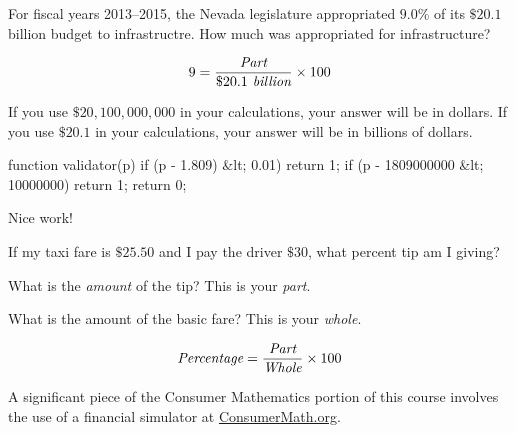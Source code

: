 \documentclass{ximera}
\begin{document}
\begin{question}
For fiscal years 2013--2015, the Nevada legislature appropriated $9.0\%$ of its $\$20.1$ billion budget to infrastructre. How much was appropriated for infrastructure? 	

\begin{solution}
\begin{hint}
\begin{equation*}9=\frac{\emph{\text{Part}}}{\$20.1\emph{\text{ billion}}}\times 100\end{equation*}
\end{hint}
\begin{hint}
If you use $\$20,100,000,000$ in your calculations, your answer will be in dollars. If you use $\$20.1$ in your calculations, your answer will be in billions of dollars.
\end{hint}
\begin{expression-answer}
function validator(p) {
    if (p - 1.809) &lt; 0.01)
      return 1;
    if (p - 1809000000 &lt; 10000000)
      return 1;
      return 0;
  }
\end{expression-answer}
\end{solution}	

Nice work!
\end{question}

\begin{question}
If my taxi fare is $\$25.50$ and I pay the driver $\$30$, what percent tip am I giving?
  \begin{solution}
    \begin{multiple-choice}
    \end{multiple-choice}
    \begin{hint}
    What is the \emph{amount} of the tip? This is your \emph{part}.
    \end{hint}
    \begin{hint}
   What is the amount of the basic fare? This is your \emph{whole}.
    \end{hint}
  	\begin{hint}
    \begin{equation*}\emph{\text{Percentage}}=\frac{\emph{\text{Part}}}{\emph{\text{Whole}}}\times 100\end{equation*}
    \end{hint}
  \end{solution}
\end{question}

A significant piece of the Consumer Mathematics portion of this course involves the use of a financial simulator at \url{ConsumerMath.org}.
\end{document}
